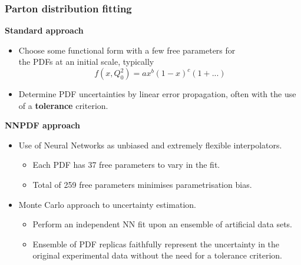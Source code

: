 \documentclass[10pt]{beamer}
\newcommand{\be}{\begin{equation*}}
\newcommand{\ee}{\end{equation*}}
\begin{document}
\begin{frame}
\begin{columns}
\begin{column}{0.55\textwidth}
  \end{column}  
  \end{columns}

\end{frame}

\begin{frame}
\frametitle{Parton distribution fitting}

\textbf{Standard approach}
\begin{itemize}
\item<1-> Choose some functional form with a few free parameters for\\ the PDFs at an initial scale, typically
		\be f(x,Q_0^2) = ax^{b}(1-x)^{c}(1+... )\ee
		\vskip10pt

\item<1-> Determine PDF uncertainties by linear error propagation, often with the use of a \textbf{tolerance} criterion.
\end{itemize}
\vskip15pt
\textbf{NNPDF approach}

\begin{itemize}
\item<1->Use of Neural Networks as unbiased and extremely flexible interpolators.
\begin{itemize}
\item<1->Each PDF has 37 free parameters to vary in the fit.
\item<1->Total of 259 free parameters minimises parametrisation bias.
\end{itemize}

\item<1->Monte Carlo approach to uncertainty estimation.
\begin{itemize}
\item<1->Perform an independent NN fit upon an ensemble of artificial data sets.\\
\item<1->Ensemble of PDF replicas faithfully represent the uncertainty in the original experimental data without the need for a tolerance criterion.
\end{itemize}
\end{itemize}

\end{frame}
\end{document}
